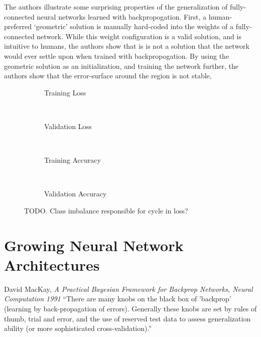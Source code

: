 \documentclass[thesis]{subfiles}
\begin{document}
	The authors illustrate some surprising properties of the generalization of fully-connected neural networks learned with backpropogation. First, a human-preferred `geometric' solution is manually hard-coded into the weights of a fully-connected network. While this weight configuration is a valid solution, and is intuitive to humans, the authors show that is is not a solution that the network would ever settle upon when trained with backpropogation. By using the geometric solution as an initialization, and training the network further, the authors show that the error-surface around the region is not stable,
	
	\begin{figure}[tb]
		\centering
		\begin{subfigure}[t]{0.49\textwidth}
			\resizebox{\linewidth}{!}{}
			\caption{Training Loss}
			\label{fig:tomplotmintrainloss}
		\end{subfigure}
		~
		\begin{subfigure}[t]{0.49\textwidth}
			\resizebox{\linewidth}{!}{}
			\caption{Validation Loss}
			\label{fig:tomplotminvalloss}
		\end{subfigure}\\
		\begin{subfigure}[t]{0.49\textwidth}
			\resizebox{\linewidth}{!}{}
			\caption{Training Accuracy}
			\label{fig:tomplotmaxtrainacc}
		\end{subfigure}
		~
		\begin{subfigure}[t]{0.49\textwidth}
			\resizebox{\linewidth}{!}{}
			\caption{Validation Accuracy}
			\label{fig:tomplotmaxvalacc}
		\end{subfigure}
		\caption[Two-or-more Clumps Problem and Structural Priors]{TODO. Class imbalance responsible for cycle in loss?}
		\label{fig:tomplot}
	\end{figure}
	
\section{Growing Neural Network Architectures}
	\begin{chapquote}{David MacKay, \textit{A Practical Bayesian Framework for Backprop Networks, Neural Computation 1991}}
		``There are many knobs on the black box of 'backprop' (learning by back-propagation of
		errors). Generally these knobs are set by rules of thumb, trial and error, and the use of reserved test data to assess generalization ability (or more sophisticated cross-validation).''
	\end{chapquote}
	
\end{document}

